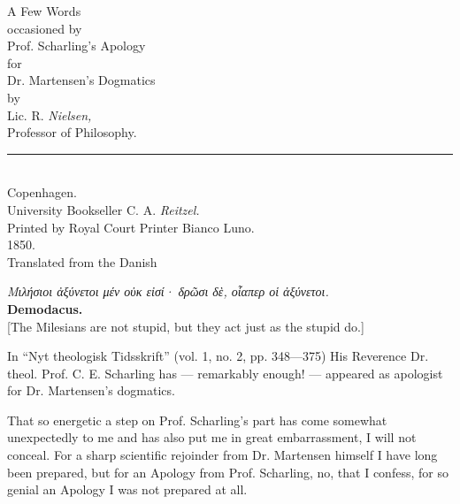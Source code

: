 \documentclass[12pt,a4paper,openany]{book}
\newcommand{\opage}[1]{\marginnote{\footnotesize\textit{[#1]}}}
\begin{document}
\begin{titlepage}
\begin{center}
\vspace*{3em}
{\Large A Few Words}\\[1em]
occasioned by\\[1em]
{\Huge Prof. Scharling's Apology}\\[1em]
for\\[1em]
{\LARGE Dr. Martensen's Dogmatics}\\[1em]
by\\[1em]
{\large Lic. R. \emph{Nielsen,}}\\
{\small Professor of Philosophy.}\\[2em]
\rule{8em}{0.4pt}\\[2em]
{\large Copenhagen.}\\[0.5em]
University Bookseller C. A. \emph{Reitzel.}\\[0.5em]
{\small Printed by Royal Court Printer Bianco Luno.}\\[0.5em]
1850.\\[4em]
{\small Translated from the Danish}
\end{center}
\end{titlepage}
\thispagestyle{empty}
\vspace*{12em}
\begin{center}
\begin{minipage}{0.8\textwidth}
\textit{Μιλήσιοι ἀξύνετοι μέν οὐκ εἰσί· δρῶσι δὲ, οἷαπερ οἱ ἀξύνετοι.}\\[0.4em]
\hspace*{\fill}\textbf{Demodacus.}\\[1em]
{\small [The Milesians are not stupid, but they act just as the stupid do.]}
\end{minipage}
\end{center}
\clearpage

\setcounter{footnote}{0}%
\opage{3}In ``Nyt theologisk Tidsskrift'' (vol. 1, no. 2, pp.
348---375) His Reverence Dr. theol. Prof. C.
E. Scharling has --- remarkably enough! --- appeared as
apologist for Dr. Martensen's dogmatics.

That so energetic a step on Prof. Scharling's
part has come somewhat unexpectedly to me and has also put me
in great embarrassment, I will not conceal. For a
sharp scientific rejoinder from Dr. Martensen himself
I have long been prepared, but for an Apology from Prof.
Scharling, no, that I confess, for so genial an
Apology I was not prepared at all.
\end{document}
